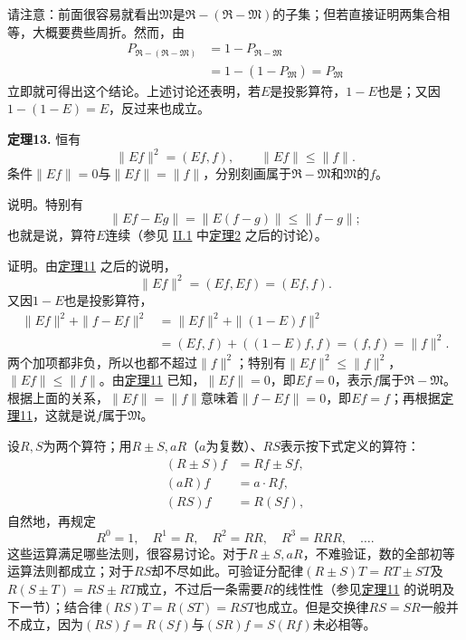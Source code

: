\documentclass[fontsize=13pt,twoside,openany,headings=normal,parskip=false,bookmarkpackage=false,DIV=calc]{scrbook}
\newcommand{\textkaishu}[1]{{\zhkaishu #1}}
\begin{document}
\hypertarget{origpage-42}{}\label{origpage-42}请注意：前面很容易就看出$\mathfrak{M}$是$\mathfrak{R}-(\mathfrak{R}-\mathfrak{M})$的子集；但若直接证明两集合相等，大概要费些周折。然而，由
\begin{align*}
P_{\mathfrak{R}-(\mathfrak{R}-\mathfrak{M})}&=1-P_{\mathfrak{R}-\mathfrak{M}}\\
&=1-(1-P_{\mathfrak{M}})=P_{\mathfrak{M}}
\end{align*}
立即就可得出这个结论。上述讨论还表明，若$E$是投影算符，$1-E$也是；又因$1-(1-E)=E$，反过来也成立。

\leavevmode{}\textbf{定理13.}\label{thm:II.13} 恒有
\[
\|Ef\|^2=(Ef,f),\qquad\|Ef\|\leq\|f\|.
\]
条件$\|Ef\|=0$与$\|Ef\|=\|f\|$，分别刻画属于$\mathfrak{R}-\mathfrak{M}$和$\mathfrak{M}$的$f$。

\textkaishu{说明。}特别有
\[
\|Ef-Eg\|=\|E(f-g)\|\leq\|f-g\|;
\]
也就是说，算符$E$连续（参见 \hyperref[sec:II.1]{II.1} 中\CJKglue \hyperref[thm:II.2]{定理2} 之后的讨论）。

\textkaishu{证明。}由\CJKglue \hyperref[thm:II.11]{定理11} 之后的说明，
\[
\|Ef\|^2=(Ef,Ef)=(Ef,f).
\]
又因$1-E$也是投影算符，
\begin{align*}
\|Ef\|^2+\|f-Ef\|^2&=\|Ef\|^2+\|(1-E)f\|^2\\
&=(Ef,f)+((1-E)f,f)=(f,f)=\|f\|^2.
\end{align*}
两个加项都非负，所以也都不超过$\|f\|^2$；特别有$\|Ef\|^2\leq\|f\|^2$，$\|Ef\|\leq\|f\|$。由\CJKglue \hyperref[thm:II.11]{定理11} 已知，$\|Ef\|=0$，即$Ef=0$，表示$f$属于$\mathfrak{R}-\mathfrak{M}$。根据上面的关系，$\|Ef\|=\|f\|$意味着$\|f-Ef\|=0$，即$Ef=f$；再根据\CJKglue \hyperref[thm:II.11]{定理11}，这就是说$f$属于$\mathfrak{M}$。

设$R,\allowbreak S$为两个算符；用$R\pm S,\allowbreak aR$（$a$为复数）、$RS$表示按下式定义的算符：
\begin{align*}
(R\pm S)f&=Rf\pm Sf,\\
(aR)f&=a\cdot Rf,\\
(RS)f&=R(Sf),
\end{align*}
自然地，再规定
\[
R^0=1,\quad R^1=R,\quad R^2=RR,\quad R^3=RRR,\quad\ldots.
\]
这些运算满足哪些法则，很容易讨论。对于$R\pm S,\allowbreak aR$，不难验证，数的全部初等运算法则都成立；对于$RS$却不尽如此。可验证分配律$(R\pm S)T=RT\pm ST$及$R(S\pm T)=RS\pm RT$成立，不过后一条需要$R$的线性性（参见\CJKglue \hyperref[thm:II.11]{定理11} 的说明及下一节）；结合律$(RS)T=R(ST)=RST$也成立。但是交换律$RS=SR$一般并不成立，因为$(RS)f=R(Sf)$与$(SR)f=S(Rf)$未必相等。
\end{document}
